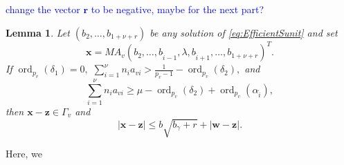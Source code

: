 \documentclass[11pt]{report}
\newtheorem{lemma}[theorem]{Lemma}
\theoremstyle{definition}
\DeclareMathOperator{\ord}{ord}
\newcommand{\edit}[1]{\textcolor{blue}{#1}}
\begin{document}
\edit{change the vector $\mathbf{r}$ to be negative, maybe for the next part?}

\begin{lemma}
  \label{lem:nonarch1}
  Let $(b_2, \dots, b_{1+\nu+r})$ be any solution of \eqref{eq:EfficientSunit} and set
  \[\mathbf{x} = MA_v(b_2, \dots, b_{\hat{i} - 1}, \lambda, b_{\hat{i}+1}, \dots, b_{1+\nu+r})^T.\]
  If $\ord_{p_v}(\delta_1) = 0,$ $\displaystyle \sum_{i = 1}^{\nu} n_{i}a_{vi} > \frac{1}{p_v-1} - \ord_{p_v}(\delta_2),$ and
\[\sum_{i = 1}^{\nu} n_{i}a_{vi}  \geq \mu - \ord_{p_v}(\delta_2) + \ord_{p_v}(\alpha_{\hat{i}}),\]
  then $\mathbf{x} - \mathbf{z} \in \Gamma_{v}$ and
\[|\mathbf{x} - \mathbf{z}| \leq b\sqrt{b_{\gamma} + r} + |\mathbf{w} - \mathbf{z}|.\]
\end{lemma}

Here, we
\end{document}

